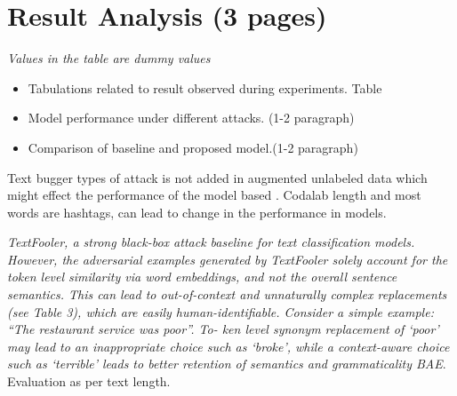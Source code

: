 \documentclass[%
	BCOR=8mm, %
	DIV=12, 
	toc=bibliography, %
	toc=listof, %
	oneside, %
	egregdoesnotlikesansseriftitles, %
	]{scrbook}
\begin{document}
\chapter{Result Analysis (3 pages)}


\textit{Values in the table are dummy values}
\begin{itemize}
\item Tabulations related to result observed during experiments. Table
\item Model performance under different attacks. (1-2 paragraph)
\item Comparison of baseline and proposed model.(1-2 paragraph)
\end{itemize}

Text bugger types of attack is not added in augmented unlabeled data which might effect the performance of the model based .
Codalab length and most words are hashtags, can lead to change in the performance in models.

\textit{TextFooler, a strong black-box attack baseline for text classification models. However, the adversarial examples generated by TextFooler solely account for the token 
level similarity via word embeddings, and not the overall sentence semantics. This can lead to out-of-context and unnaturally complex replacements (see Table 3), which are 
easily human-identifiable. Consider a simple example: “The restaurant service was poor”. To- ken level synonym replacement of ‘poor’ may lead to an inappropriate choice 
such as ‘broke’, while a context-aware choice such as ‘terrible’ leads to better retention of semantics and grammaticality BAE}.
Evaluation as per text length. 
\end{document}
